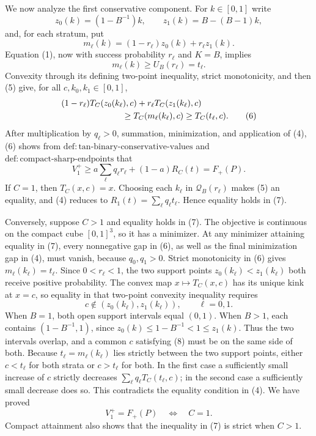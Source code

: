 We now analyze the first conservative component.  For \(k\in[0,1]\)
write
\[
 z_0(k)=(1-B^{-1})k,\qquad z_1(k)=B-(B-1)k,
\]
and, for each stratum, put
\[
 m_\ell(k)=(1-r_\ell)z_0(k)+r_\ell z_1(k).
\]
Equation (1), now with success probability \(r_\ell\) and
\(K=B\), implies
\[
 m_\ell(k)\geq U_B(r_\ell)=t_\ell.                 \tag{5}
\]
Convexity through its defining two-point inequality, strict
monotonicity, and then (5) give, for all \(c,k_0,k_1\in[0,1]\),
\[
 \begin{aligned}
 &(1-r_\ell)T_C(z_0(k_\ell),c)
      +r_\ell T_C(z_1(k_\ell),c)\\
 &\hspace{25mm}\geq T_C(m_\ell(k_\ell),c)
 \geq T_C(t_\ell,c).                               \tag{6}
 \end{aligned}
\]
After multiplication by \(q_\ell>0\), summation, minimization, and
application of (4), (6) shows from
\(\mathrm{def{:}tan\text{-}binary\text{-}conservative\text{-}values}\)
and \(\mathrm{def{:}compact\text{-}sharp\text{-}endpoints}\) that
\[
 V_1^+\geq a\sum_\ell q_\ell r_\ell+(1-a)R_C(t)=F_+(P).       \tag{7}
\]
If \(C=1\), then \(T_C(x,c)=x\).  Choosing each \(k_\ell\) in
\(\mathcal Q_B(r_\ell)\) makes (5) an equality, and (4) reduces to
\(R_1(t)=\sum_\ell q_\ell t_\ell\).  Hence equality holds in (7).

Conversely, suppose \(C>1\) and equality holds in (7).  The objective
is continuous on the compact cube \([0,1]^3\), so it has a minimizer.
At any minimizer attaining equality in (7), every nonnegative gap in
(6), as well as the final minimization gap in (4), must vanish, because
\(q_0,q_1>0\).  Strict monotonicity in (6) gives
\(m_\ell(k_\ell)=t_\ell\).  Since \(0<r_\ell<1\), the two support
points \(z_0(k_\ell)<z_1(k_\ell)\) both receive positive probability.
The convex map \(x\mapsto T_C(x,c)\) has its unique kink at \(x=c\),
so equality in that two-point convexity inequality requires
\[
 c\notin(z_0(k_\ell),z_1(k_\ell)),\qquad \ell=0,1.             \tag{8}
\]
When \(B=1\), both open support intervals equal \((0,1)\).  When
\(B>1\), each contains \((1-B^{-1},1)\), since
\(z_0(k)\leq1-B^{-1}<1\leq z_1(k)\).  Thus the two intervals overlap,
and a common \(c\) satisfying (8) must be on the same side of both.
Because \(t_\ell=m_\ell(k_\ell)\) lies strictly between the two support
points, either \(c<t_\ell\) for both strata or \(c>t_\ell\) for both.
In the first case a sufficiently small increase of \(c\) strictly
decreases \(\sum_\ell q_\ell T_C(t_\ell,c)\); in the second case a
sufficiently small decrease does so.  This contradicts the equality
condition in (4).  We have proved
\[
 V_1^+=F_+(P)\quad\Longleftrightarrow\quad C=1.                 \tag{9}
\]
Compact attainment also shows that the inequality in (7) is strict
when \(C>1\).

